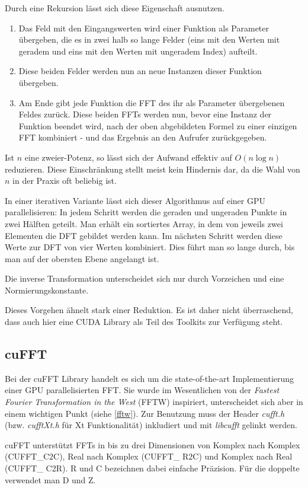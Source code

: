 		Durch eine Rekursion lässt sich diese Eigenschaft ausnutzen.
		\begin{enumerate}
		    \item Das Feld mit den Eingangswerten wird einer Funktion als Parameter übergeben, die es in zwei halb so lange Felder (eins mit den Werten mit geradem und eins mit den Werten mit ungeradem Index) aufteilt.
    \item Diese beiden Felder werden nun an neue Instanzen dieser Funktion übergeben.
    \item Am Ende gibt jede Funktion die FFT des ihr als Parameter übergebenen Feldes zurück. Diese beiden FFTs werden nun, bevor eine Instanz der Funktion beendet wird, nach der oben abgebildeten Formel zu einer einzigen FFT kombiniert - und das Ergebnis an den Aufrufer zurückgegeben.
		\end{enumerate}
		Ist $n$ eine zweier-Potenz, so lässt sich der Aufwand effektiv auf $O(n\log n)$ reduzieren. Diese Einschränkung stellt meist kein Hindernis dar, da die Wahl von $n$ in der Praxis oft beliebig ist.
		
		In einer iterativen Variante lässt sich dieser Algorithmus auf einer GPU parallelisieren: In jedem Schritt werden die geraden und ungeraden Punkte in zwei Hälften geteilt. Man erhält ein sortiertes Array, in dem von jeweils zwei Elementen die DFT gebildet werden kann. Im nächsten Schritt werden diese Werte zur DFT von vier Werten kombiniert. Dies führt man so lange durch, bis man auf der obersten Ebene angelangt ist. 
		
		Die inverse Transformation unterscheidet sich nur durch Vorzeichen und eine Normierungskonstante.
		
		Dieses Vorgehen ähnelt stark einer Reduktion. Es ist daher nicht überraschend, dass auch hier eine CUDA Library als Teil des Toolkits zur Verfügung steht.
		
		\subsection{cuFFT}
		Bei der cuFFT Library handelt es sich um die state-of-the-art Implementierung einer GPU parallelisierten FFT. Sie wurde im Wesentlichen von der \textit{Fastest Fourier Transformation in the West} (FFTW) inspiriert, unterscheidet sich aber in einem wichtigen Punkt (siehe \ref{fftw}). Zur Benutzung muss der Header \textit{cufft.h} (bzw. \textit{cufftXt.h} für Xt Funktionalität) inkludiert und mit \textit{libcufft} gelinkt werden.
		
		cuFFT unterstützt FFTs in bis zu drei Dimensionen von Komplex nach Komplex (CUFFT{\_}C2C), Real nach Komplex (CUFFT\_ R2C) und Komplex nach Real (CUFFT\_ C2R). R und C bezeichnen dabei einfache Präzision. Für die doppelte verwendet man D und Z.
	
